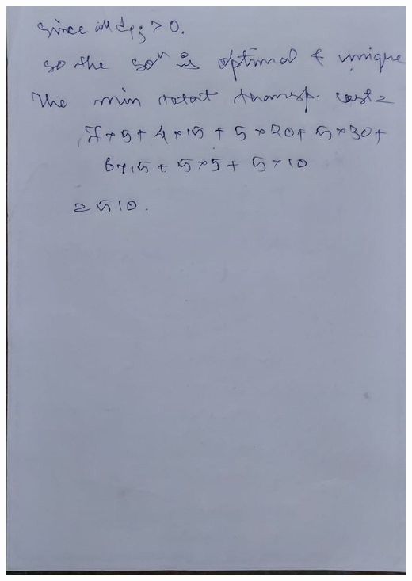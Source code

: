 \documentclass[12pt, letterpaper, twoside]{book}
\begin{document}
\includegraphics[width=\paperwidth, height=\paperheight]{Page24}
\end{document}
